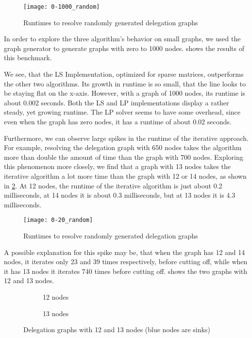 \begin{figure}[t]
    \centering
    \texttt{[image: 0-1000\_random]}
    \caption{Runtimes to resolve randomly generated delegation graphs}
    \label{fig:random-small}
\end{figure}

In order to explore the three algorithm's behavior on small graphs, we used the graph generator to generate graphs with zero to 1000 nodes.  shows the results of this benchmark.

We see, that the LS Implementation, optimized for sparse matrices, outperforms the other two algorithms. Its growth in runtime is so small, that the line looks to be staying flat on the x-axis. However, with a graph of 1000 nodes, its runtime is about 0.002 seconds. Both the LS and LP implementations display a rather steady, yet growing runtime. The LP solver seems to have some overhead, since even when the graph has zero nodes, it has a runtime of about 0.02 seconds.

Furthermore, we can observe large spikes in the runtime of the iterative approach. For example, resolving the delegation graph with 650 nodes takes the algorithm more than double the amount of time than the graph with 700 nodes. Exploring this phenomenon more closely, we find that a graph with 13 nodes takes the iterative algorithm a lot more time than the graph with 12 or 14 nodes, as shown in \cref{fig:random-tiny}. At 12 nodes, the runtime of the iterative algorithm is just about 0.2 milliseconds, at 14 nodes it is about 0.3 milliseconds, but at 13 nodes it is 4.3 milliseconds. 

\begin{figure}[t]
    \centering
    \texttt{[image: 0-20\_random]}
    \caption{Runtimes to resolve randomly generated delegation graphs}
    \label{fig:random-tiny}
\end{figure}

A possible explanation for this spike may be, that when the graph has 12 and 14 nodes, it iterates only 23 and 39 times respectively, before cutting off, while when it has 13 nodes it iterates 740 times before cutting off.  shows the two graphs with 12 and 13 nodes.

\begin{figure}[t]
    \centering
    \begin{subfigure}[t]{0.45\textwidth}
        \centering
        \caption{12 nodes}
        \label{subfig:random-12and13-12}
    \end{subfigure}
    \hfill
    \begin{subfigure}[t]{0.45\textwidth}
        \centering
        \caption{13 nodes}
        \label{subfig:random-12and13-13}
    \end{subfigure}
    \caption{Delegation graphs with 12 and 13 nodes (blue nodes are sinks)}
    \label{fig:random-12and13}
\end{figure}

